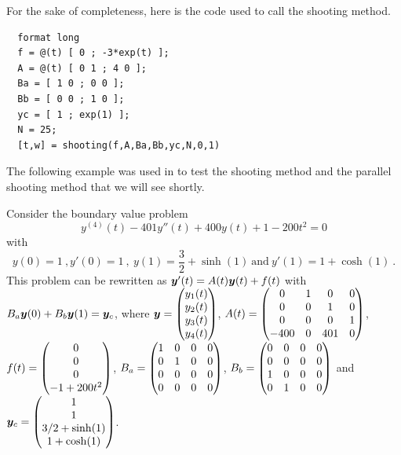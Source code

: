 \begin{egg}
For the sake of completeness, here is the code used to call the
shooting method.

\begin{code}
\small
\begin{verbatim}
  format long
  f = @(t) [ 0 ; -3*exp(t) ];
  A = @(t) [ 0 1 ; 4 0 ];
  Ba = [ 1 0 ; 0 0 ];
  Bb = [ 0 0 ; 1 0 ];
  yc = [ 1 ; exp(1) ];
  N = 25;
  [t,w] = shooting(f,A,Ba,Bb,yc,N,0,1)
\end{verbatim}
\end{code}
\label{eggShootCode1}
\end{egg}

\begin{egg}
The following example was used in \cite{CSD} to test the shooting
method and the parallel shooting method that we will see shortly.

Consider the boundary value problem
\[
  y^{(4)}(t) - 401 y''(t) + 400 y(t) +1 - 200 t^2 = 0
\]
with
\[
 y(0) = 1 \ , y'(0) = 1 \ , \ y(1) = \frac{3}{2} + \sinh(1) \
 \text{and}\  y'(1) = 1 + \cosh(1) \ .
\]
This problem can be rewritten as
$\bm{y}'(t) = A(t) \bm{y}(t) + f(t)$ with
$B_a \bm{y}(0) + B_b\bm{y}(1) = \bm{y}_c$, where
$\displaystyle \bm{y}
= \begin{pmatrix} y_1(t) \\ y_2(t) \\ y_3(t) \\ y_4(t) \end{pmatrix}$,
$\displaystyle A(t) = \begin{pmatrix} 0 & 1 & 0 & 0 \\ 0 & 0 & 1 & 0 \\
0 & 0 & 0 & 1 \\ -400 & 0 & 401 & 0 \end{pmatrix}$,
$\displaystyle f(t) = \begin{pmatrix} 0 \\ 0 \\ 0 \\ -1 + 200
t^2 \end{pmatrix}$,
$\displaystyle B_a = \begin{pmatrix} 1 & 0 & 0 & 0 \\ 0 & 1 & 0 & 0 \\
 0 & 0 & 0 & 0 \\ 0 & 0 & 0 & 0 \end{pmatrix}$,
$\displaystyle B_b = \begin{pmatrix} 0 & 0 & 0 & 0 \\ 0 & 0 & 0 & 0 \\
 1 & 0 & 0 & 0 \\ 0 & 1 & 0 & 0 \end{pmatrix}$ and
$\displaystyle \bm{y}_c = \begin{pmatrix} 1 \\ 1 \\ 3/2 + \sinh(1) \\
 1 + \cosh(1) \end{pmatrix}$.


\end{egg}
